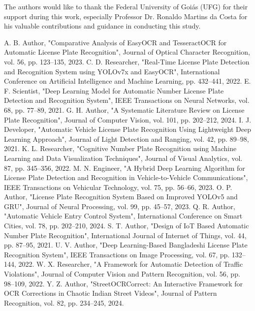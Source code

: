 \documentclass[conference]{IEEEtran}
\begin{document}
	The authors would like to thank the Federal University of Goiás (UFG) for their support during this work, especially Professor Dr. Ronaldo Martins da Costa for his valuable contributions and guidance in conducting this study.
	
	\begin{thebibliography}{00}
		 A. B. Author, "Comparative Analysis of EasyOCR and TesseractOCR for Automatic License Plate Recognition", Journal of Optical Character Recognition, vol. 56, pp. 123–135, 2023.
		 C. D. Researcher, "Real-Time License Plate Detection and Recognition System using YOLOv7x and EasyOCR", International Conference on Artificial Intelligence and Machine Learning, pp. 432–441, 2022.
		 E. F. Scientist, "Deep Learning Model for Automatic Number License Plate Detection and Recognition System", IEEE Transactions on Neural Networks, vol. 68, pp. 77–89, 2021.
		 G. H. Author, "A Systematic Literature Review on License Plate Recognition", Journal of Computer Vision, vol. 101, pp. 202–212, 2024.
		 I. J. Developer, "Automatic Vehicle License Plate Recognition Using Lightweight Deep Learning Approach", Journal of Light Detection and Ranging, vol. 42, pp. 89–98, 2021.
		 K. L. Researcher, "Cognitive Number Plate Recognition using Machine Learning and Data Visualization Techniques", Journal of Visual Analytics, vol. 87, pp. 345–356, 2022.
		 M. N. Engineer, "A Hybrid Deep Learning Algorithm for License Plate Detection and Recognition in Vehicle-to-Vehicle Communications", IEEE Transactions on Vehicular Technology, vol. 75, pp. 56–66, 2023.
		 O. P. Author, "License Plate Recognition System Based on Improved YOLOv5 and GRU", Journal of Neural Processing, vol. 99, pp. 45–57, 2023.
		 Q. R. Author, "Automatic Vehicle Entry Control System", International Conference on Smart Cities, vol. 78, pp. 202–210, 2024.
		 S. T. Author, "Design of IoT Based Automatic Number Plate Recognition", International Journal of Internet of Things, vol. 44, pp. 87–95, 2021.
		 U. V. Author, "Deep Learning-Based Bangladeshi License Plate Recognition System", IEEE Transactions on Image Processing, vol. 67, pp. 132–144, 2022.
		 W. X. Researcher, "A Framework for Automatic Detection of Traffic Violations", Journal of Computer Vision and Pattern Recognition, vol. 56, pp. 98–109, 2022.
		 Y. Z. Author, "StreetOCRCorrect: An Interactive Framework for OCR Corrections in Chaotic Indian Street Videos", Journal of Pattern Recognition, vol. 82, pp. 234–245, 2024.

\end{thebibliography}
\end{document}

